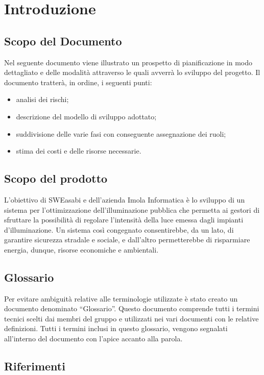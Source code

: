 \chapter{Introduzione}

\section{Scopo del Documento}
Nel seguente documento viene illustrato un prospetto di pianificazione in modo dettagliato e delle modalità attraverso le quali avverrà lo sviluppo del progetto. Il documento tratterà, in ordine, i seguenti punti:
\begin{itemize}
    \item analisi dei rischi;
    \item descrizione del modello di sviluppo adottato;
    \item suddivisione delle varie fasi con conseguente assegnazione dei ruoli;
    \item stima dei costi e delle risorse necessarie.
\end{itemize}

\section{Scopo del prodotto}
L'obiettivo di SWEasabi e dell'azienda Imola Informatica è lo sviluppo di un sistema per l'ottimizzazione dell'illuminazione pubblica che permetta ai gestori di sfruttare la possibilità di regolare l'intensità della luce emessa dagli impianti d'illuminazione. Un sistema così congegnato consentirebbe, da un lato, di garantire sicurezza stradale e sociale, e dall'altro permetterebbe di risparmiare energia, dunque, risorse economiche e ambientali.


\section{Glossario}
Per evitare ambiguità relative alle terminologie utilizzate è stato creato un documento denominato “Glossario”. Questo documento comprende tutti i termini tecnici scelti dai membri del gruppo e utilizzati nei vari documenti con le relative definizioni. Tutti i termini inclusi in questo glossario, vengono segnalati all'interno del documento con l'apice accanto alla parola.

\section{Riferimenti}
